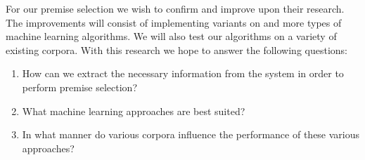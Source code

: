 For our premise selection we wish to confirm and improve upon their research.
The improvements will consist of implementing variants on and more types of machine learning algorithms.
We will also test our algorithms on a variety of existing \coq corpora.
With this research we hope to answer the following questions:
\begin{enumerate}
\item How can we extract the necessary information from the \coq system in order to perform premise selection?
\item What machine learning approaches are best suited?
\item In what manner do various corpora influence the performance of these various approaches?
\end{enumerate}
